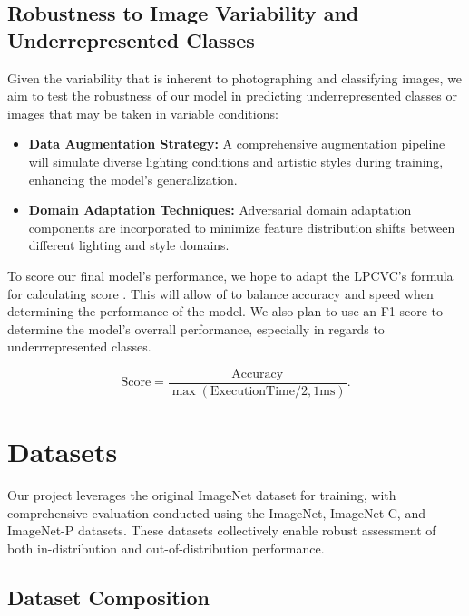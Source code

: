 \documentclass[11pt, oneside]{article}   	%
\begin{document}
\subsection*{Robustness to Image Variability and Underrepresented Classes}

Given the variability that is inherent to photographing and classifying images, we aim to test the robustness of our model in predicting underrepresented classes or images that may be taken in variable conditions:

\begin{itemize}
	\item \textbf{Data Augmentation Strategy:} A comprehensive augmentation pipeline will simulate diverse lighting conditions and artistic styles during training, enhancing the model’s generalization.
	
	
	\item \textbf{Domain Adaptation Techniques:} Adversarial domain adaptation components are incorporated to minimize feature distribution shifts between different lighting and style domains.
\end{itemize}

To score our final model's performance, we hope to adapt the LPCVC's formula for calculating score \cite{chen20242023lowpowercomputervision}. This will allow of to balance accuracy and speed when determining the performance of the model. We also plan to use an F1-score to determine the model's overrall performance, especially in regards to underrrepresented classes.

\begin{equation}
\label{eq:finalScore}
	\text{Score} = \frac{\text{Accuracy}}{\max(\text{ExecutionTime}/2, 1\text{ms})}. 
\end{equation}




\section*{Datasets}

Our project leverages the original ImageNet dataset for training, with comprehensive evaluation conducted using the ImageNet, ImageNet-C, and ImageNet-P datasets. These datasets collectively enable robust assessment of both in-distribution and out-of-distribution performance.

\subsection*{Dataset Composition}
\end{document}
